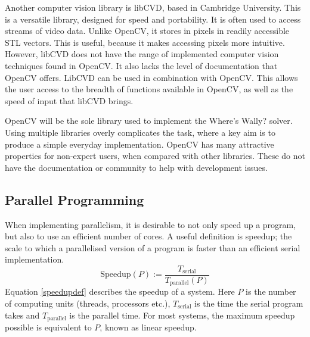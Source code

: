 \documentclass[../main.tex]{subfiles}
\begin{document}
    Another computer vision library is libCVD\cite{libcvd}, based in Cambridge University.
    This is a versatile library, designed for speed and portability.
    It is often used to access streams of video data.
    Unlike OpenCV, it stores in pixels in readily accessible STL vectors.
    This is useful, because it makes accessing pixels more intuitive.
    However, libCVD does not have the range of implemented computer vision techniques found in OpenCV.
    It also lacks the level of documentation that OpenCV offers.
    LibCVD can be used in combination with OpenCV\cite{translatar}.
    This allows the user access to the breadth of functions available in OpenCV, as well as the speed of input that libCVD brings.

    OpenCV will be the sole library used to implement the Where's Wally? solver.
    Using multiple libraries overly complicates the task, where a key aim is to produce a simple everyday implementation.
    OpenCV has many attractive properties for non-expert users, when compared with other libraries.
    These do not have the documentation or community to help with development issues.

  \subsection{Parallel Programming}
    When implementing parallelism, it is desirable to not only speed up a program, but also to use an efficient number of cores.
    A useful definition is speedup; the scale to which a parallelised version of a program is faster than an efficient serial implementation.
    \begin{equation}
      \text{Speedup}(P) := \frac{T_\text{serial}}{T_\text{parallel}(P)}
      \label{speedupdef}
    \end{equation}
    Equation \ref{speedupdef} describes the speedup of a system.
    Here $P$ is the number of computing units (threads, processors etc.), $T_\text{serial}$ is the time the serial program takes and $T_\text{parallel}$ is the parallel time.
    For most systems, the maximum speedup possible is equivalent to $P$, known as linear speedup.
\end{document}
